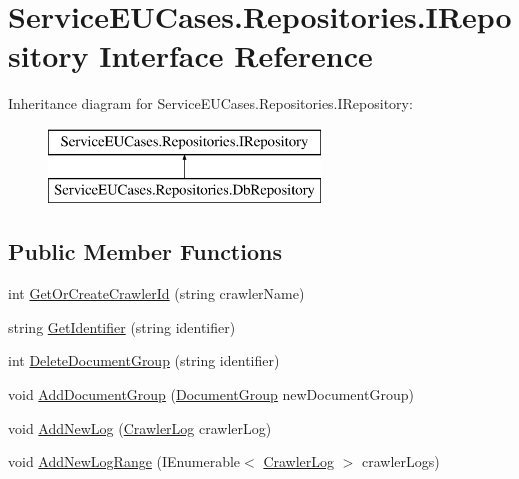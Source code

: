 \hypertarget{interface_service_e_u_cases_1_1_repositories_1_1_i_repository}{\section{Service\-E\-U\-Cases.\-Repositories.\-I\-Repository Interface Reference}
\label{interface_service_e_u_cases_1_1_repositories_1_1_i_repository}
}
Inheritance diagram for Service\-E\-U\-Cases.\-Repositories.\-I\-Repository\-:\begin{figure}[H]
\begin{center}
\leavevmode
\includegraphics[height=2.000000cm]{interface_service_e_u_cases_1_1_repositories_1_1_i_repository}
\end{center}
\end{figure}
\subsection*{Public Member Functions}
\begin{DoxyCompactItemize}
\item 
int \hyperlink{interface_service_e_u_cases_1_1_repositories_1_1_i_repository_a99d495d6c3f61baf8729653467cd15ce}{Get\-Or\-Create\-Crawler\-Id} (string crawler\-Name)
\item 
string \hyperlink{interface_service_e_u_cases_1_1_repositories_1_1_i_repository_abfdba02543cd8c770e50bbc615c448d9}{Get\-Identifier} (string identifier)
\item 
int \hyperlink{interface_service_e_u_cases_1_1_repositories_1_1_i_repository_a1c5941b15b47af92c02ff804a3cf32b6}{Delete\-Document\-Group} (string identifier)
\item 
void \hyperlink{interface_service_e_u_cases_1_1_repositories_1_1_i_repository_a1dc7e14bffc195cc3fc51df35128064c}{Add\-Document\-Group} (\hyperlink{class_service_e_u_cases_1_1_data_1_1_document_group}{Document\-Group} new\-Document\-Group)
\item 
void \hyperlink{interface_service_e_u_cases_1_1_repositories_1_1_i_repository_af8b3072d0263cf8cd3e6175577938fa3}{Add\-New\-Log} (\hyperlink{class_service_e_u_cases_1_1_data_1_1_crawler_log}{Crawler\-Log} crawler\-Log)
\item 
void \hyperlink{interface_service_e_u_cases_1_1_repositories_1_1_i_repository_ae8af796db94815cb1e3639e73f0b8732}{Add\-New\-Log\-Range} (I\-Enumerable$<$ \hyperlink{class_service_e_u_cases_1_1_data_1_1_crawler_log}{Crawler\-Log} $>$ crawler\-Logs)
\end{DoxyCompactItemize}


